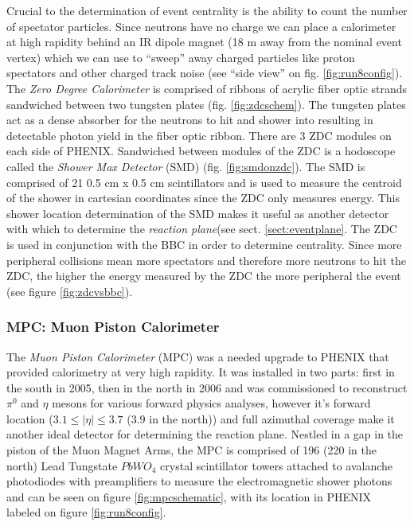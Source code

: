 Crucial to the determination of event centrality is the ability to count the number of spectator particles. Since neutrons have no charge we can place a calorimeter at high rapidity behind an IR dipole magnet (18 m away from the nominal event vertex) which we can use to ``sweep'' away charged particles like proton spectators and other charged track noise (see ``side view'' on fig. \ref{fig:run8config}). The \textit{Zero Degree Calorimeter}\citep{ZDCfocus} is comprised of ribbons of acrylic fiber optic strands sandwiched between two tungsten plates (fig. \ref{fig:zdcschem}). The tungsten plates act as a dense absorber for the neutrons to hit and shower into resulting in detectable photon yield in the fiber optic ribbon. There are 3 ZDC modules on each side of PHENIX. Sandwiched between modules of the ZDC is a hodoscope called the \textit{Shower Max Detector} (SMD) (fig. \ref{fig:smdonzdc}). The SMD is comprised of 21 0.5 cm x 0.5 cm scintillators and is used to measure the centroid of the shower in cartesian coordinates since the ZDC only measures energy\citep{phenixzdc}. This shower location determination of the SMD makes it useful as another detector with which to determine the \textit{reaction plane}(see sect. \ref{sect:eventplane}. The ZDC is used in conjunction with the BBC in order to determine centrality. Since more peripheral collisions mean more spectators and therefore more neutrons to hit the ZDC, the higher the energy measured by the ZDC the more peripheral the event (see figure \ref{fig:zdcvsbbc}\citep{Ghosh2001}). 

\subsubsection{MPC: Muon Piston Calorimeter}
The \textit{Muon Piston Calorimeter} (MPC) was a needed upgrade to PHENIX that provided calorimetry at very high rapidity\citep{kleinjanthesis}. It was installed in two parts: first in the south in 2005, then in the north in 2006 and was commissioned to reconstruct $\pi^{0}$ and $\eta$ mesons for various forward physics analyses, however it's forward location ($3.1 \leq  | \eta | \leq 3.7$ ($3.9$ in the north)) and full azimuthal coverage make it another ideal detector for determining the reaction plane. Nestled in a gap in the piston of the Muon Magnet Arms, the MPC is comprised of 196 (220 in the north) Lead Tungstate $PbWO_4$ crystal scintillator towers attached to avalanche photodiodes with preamplifiers to measure the electromagnetic shower photons and can be seen on figure \ref{fig:mpcschematic}, with its location in PHENIX labeled on figure \ref{fig:run8config}.  

